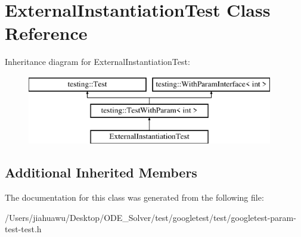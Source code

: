 \hypertarget{class_external_instantiation_test}{}\section{External\+Instantiation\+Test Class Reference}
\label{class_external_instantiation_test}
Inheritance diagram for External\+Instantiation\+Test\+:\begin{figure}[H]
\begin{center}
\leavevmode
\includegraphics[height=3.000000cm]{class_external_instantiation_test}
\end{center}
\end{figure}
\subsection*{Additional Inherited Members}


The documentation for this class was generated from the following file\+:\begin{DoxyCompactItemize}
\item 
/\+Users/jiahuawu/\+Desktop/\+O\+D\+E\+\_\+\+Solver/test/googletest/test/googletest-\/param-\/test-\/test.\+h\end{DoxyCompactItemize}
